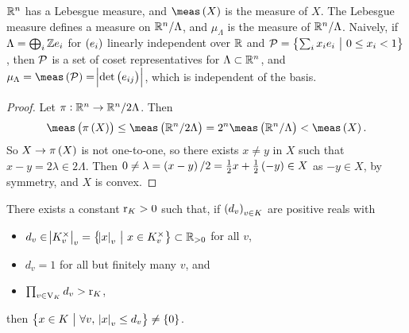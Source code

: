 \begin{remark*}
$ \mathbb{R}^n $ has a Lebesgue measure, and $ \meas\br{X} $ is the measure of $ X $. The Lebesgue measure defines a measure on $ \mathbb{R}^n / \Lambda $, and $ \mu_\Lambda $ is the measure of $ \mathbb{R}^n / \Lambda $. Naively, if $ \Lambda = \bigoplus_i \mathbb{Z} e_i $ for $ \br{e_i} $ linearly independent over $ \mathbb{R} $ and $ \PPP = \cbr{\sum_i x_ie_i \st 0 \le x_i < 1} $, then $ \mathcal{P} $ is a set of coset representatives for $ \Lambda \subset \mathbb{R}^n $, and $ \mu_\Lambda = \meas\br{\PPP} = \abs{\det \br{e_{ij}}} $, which is independent of the basis.
\end{remark*}

\begin{proof}
Let $ \pi : \mathbb{R}^n \to \mathbb{R}^n / 2\Lambda $. Then
$$ \meas\br{\pi\br{X}} \le \meas\br{\RR^n / 2\Lambda} = 2^n\meas\br{\RR^n / \Lambda} < \meas\br{X}. $$
So $ X \to \pi\br{X} $ is not one-to-one, so there exists $ x \ne y $ in $ X $ such that $ x - y = 2\lambda \in 2\Lambda $. Then $ 0 \ne \lambda = \br{x - y} / 2 = \tfrac{1}{2}x + \tfrac{1}{2}\br{-y} \in X $ as $ -y \in X $, by symmetry, and $ X $ is convex.
\end{proof}

\begin{theorem}
\label{thm:7.3}
There exists a constant $ \mathrm{r}_K > 0 $ such that, if $ \br{d_v}_{v \in K} $ are positive reals with
\begin{itemize}
\item $ d_v \in \abs{K_v^\times}_v = \cbr{\abs{x}_v \st x \in K_v^\times} \subset \RR_{> 0} $ for all $ v $,
\item $ d_v = 1 $ for all but finitely many $ v $, and
\item $ \prod_{v \in \mathrm{V}_K} d_v > \mathrm{r}_K $,
\end{itemize}
then $ \cbr{x \in K \st \forall v, \ \abs{x}_v \le d_v} \ne \cbr{0} $.
\end{theorem}

